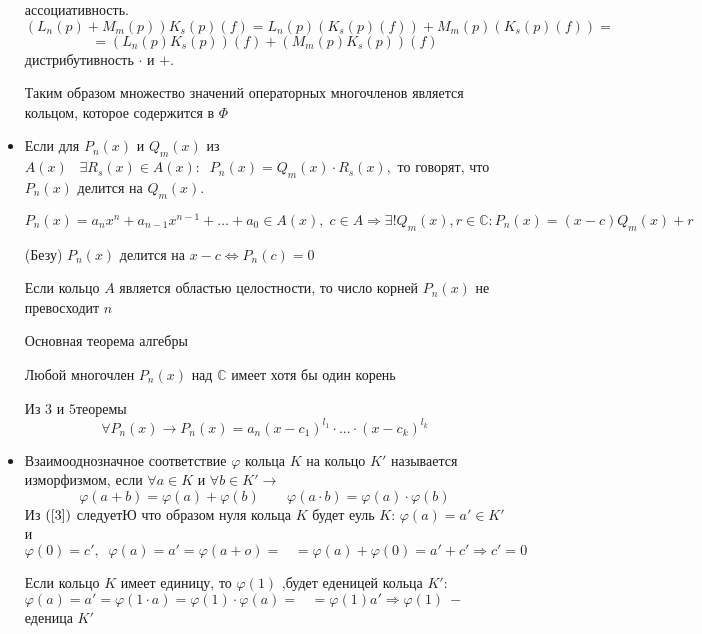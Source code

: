 \begin{itemize}
    ассоциативность. $$(L_n(p)+M_m(p))K_s(p)(f)=L_n(p)(K_s(p)(f))+M_m(p)(K_s(p)(f))= $$ 
    $$ = (L_n(p)K_s(p))(f)+(M_m(p)K_s(p))(f)$$дистрибутивность $\cdot $ и $+$.\par
    Таким образом множество значений операторных многочленов является кольцом, которое содержится в $\varPhi$
    \item Если для $P_n(x)$ и $Q_m(x)$ из $A(x)\;\;\;\exists R_s(x)\in A(x): \;\;P_n(x)=Q_m(x)\cdot R_s(x),$ то говорят, что $P_n(x)$ делится на $Q_m(x)$.
    \begin{theorem}
    $$P_n(x) = a_n x^n + a_{n-1} x^{n-1} + \dots + a_0 \in A(x),\;c \in A \Rightarrow \exists ! Q_m(x), r\in \mathds{C}:P_n(x)=(x-c)Q_m(x)+r$$
    \end{theorem}
    \begin{theorem}
    (Безу) $P_n(x)$ делится на $x-c\Leftrightarrow P_n(c)=0$
    \end{theorem}
    \begin{theorem}
    Если кольцо $A$ является областью целостности, то число корней $P_n(x)$ не превосходит $n$
    \end{theorem}
    \begin{theorem}
    Основная теорема алгебры \par
    Любой многочлен $P_n(x)$ над $\mathds{C}$ имеет хотя бы один корень
    \end{theorem}
    \begin{proposition}
    Из $3$ и $5$теоремы \begin{equation}
        \forall P_n(x)\rightarrow P_n(x)=a_n(x-c_1)^{l_1}\cdot ... 
    \cdot (x-c_k)^{l_k} 
    \end{equation}
    \end{proposition}
    \item Взаимооднозначное соответствие $\varphi$ кольца $K$ на кольцо $K'$ называется изморфизмом, если $\forall a\in K $ и $\forall b\in K'\rightarrow$
    \begin{equation}
    \label{3}
        \varphi(a+b)=\varphi(a)+\varphi(b)\;\;\;\;\;\;\;\varphi(a\cdot b)=\varphi(a)\cdot\varphi(b)
    \end{equation}
    Из $(\ref{3})$ следуетЮ что образом нуля кольца $K$ будет еуль $K$: $\varphi(a)=a'\in K'$ и $\varphi(0)=c',\;\;\varphi(a)=a'=\varphi(a+o)=\;\;\;=\varphi(a)+\varphi(0)=a'+c'\Rightarrow c'=0$\par
    Если кольцо $K$ имеет единицу, то $\varphi(1)$ ,будет еденицей кольца $K'$: $\varphi(a)=a'=\varphi(1\cdot a )= \varphi(1)\cdot \varphi(a) =\;\;\;= \varphi(1) a'\Rightarrow\varphi(1)~-~$ еденица $K'$ 

\end{itemize}
